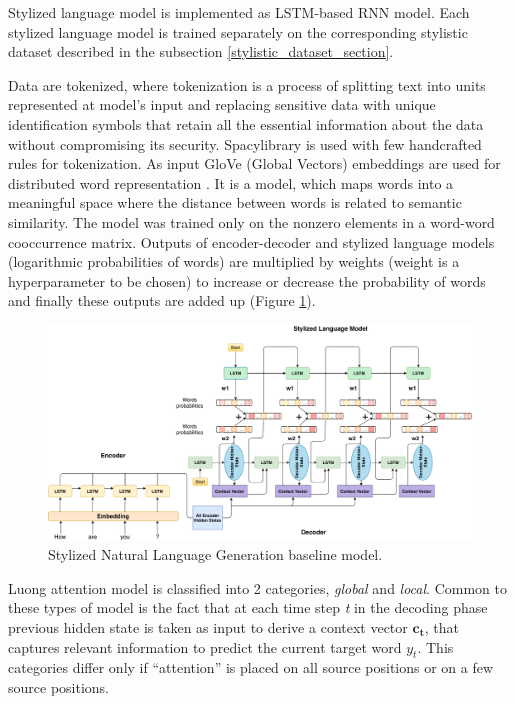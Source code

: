 Stylized language model is implemented as LSTM-based RNN model. Each stylized language model is trained separately on the corresponding stylistic dataset described in the subsection \ref{stylistic_dataset_section}.

Data are tokenized, where tokenization is a process of splitting text into units represented at model's input and replacing sensitive data with unique identification symbols that retain all the essential information about the data without compromising its security. Spacy\protect\footnotemark library is used with few handcrafted rules for tokenization. As input GloVe (Global Vectors) embeddings are used for distributed word representation \cite{pennington2014glove}. It is a model, which maps words into a meaningful space where the distance between words is related to semantic similarity. The model was trained only on the nonzero elements in a word-word cooccurrence matrix. Outputs of encoder-decoder and stylized language models (logarithmic probabilities of words) are multiplied by weights (weight is a hyperparameter to be chosen) to increase or decrease the probability of words and finally these outputs are added up (Figure \ref{implementation_architecture}).


\begin{figure}[hbt]
  \centering
  \includegraphics[width=1\textwidth]{figures/combine_models.pdf}
  \caption{Stylized Natural Language Generation baseline model.}
  \label{implementation_architecture}
\end{figure}

Luong attention model is classified into 2 categories, \textit{global} and \textit{local}. Common to these types of model is the fact that at each time step \textit{t} in the decoding phase previous hidden state is taken as input to derive a context vector $\mathbf{c_t}$, that captures relevant information to predict the current target word $y_t$. This categories differ only if ``attention'' is placed on all source positions or on a few source positions.

